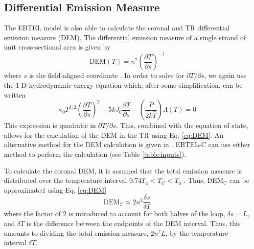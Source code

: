 \documentclass[preprint,10pt]{aastex}
\begin{document}
\subsection{Differential Emission Measure}\label{DEM}
%
The EBTEL model is also able to calculate the coronal and TR differential emission measure (DEM). The differential emission measure of a single strand of unit cross-sectional area is given by
\begin{equation}
\text{DEM}(T) = n^2\left(\frac{\partial T}{\partial s}\right)^{-1}
\label{eq:DEM}
\end{equation}
where $s$ is the field-aligned coordinate \citep{klimchuk_highly_2008}. In order to solve for $\partial T/\partial s$, we again use the 1-D hydrodynamic energy equation which, after some simplification, can be written 
\begin{equation}
\kappa_0T^{3/2}\left(\frac{\partial T}{\partial s}\right)^2-5kJ_0\frac{\partial T}{\partial s}-\left(\frac{\bar{P}}{2k\bar{T}}\right)\Lambda(T)=0
\label{eq:quadDEM}
\end{equation}
This expression is quadratic in $\partial T/\partial s$. This, combined with the equation of state, allows for the calculation of the DEM in the TR using Eq. \ref{eq:DEM}. An alternative method for the DEM calculation is given in \citet{klimchuk_highly_2008}. EBTEL-C can use either method to perform the calculation (see Table \ref{table:inputs}).
\par To calculate the coronal DEM, it is assumed that the total emission measure is distributed over the temperature interval $0.74T_a<T_{C}<T_a$ \citep{klimchuk_highly_2008}. Thus, DEM$_C$ can be approximated using Eq. \ref{eq:DEM}
\begin{equation}
\text{DEM}_C \approx 2n^2\frac{\delta s}{\delta T}
\label{eq:cDEM}
\end{equation}
where the factor of 2 is introduced to account for both halves of the loop, $\delta s =L$, and $\delta T$ is the difference between the endpoints of the DEM interval. Thus, this amounts to dividing the total emission measure, $2n^2L$, by the temperature interval $\delta T$.
%
\end{document}
